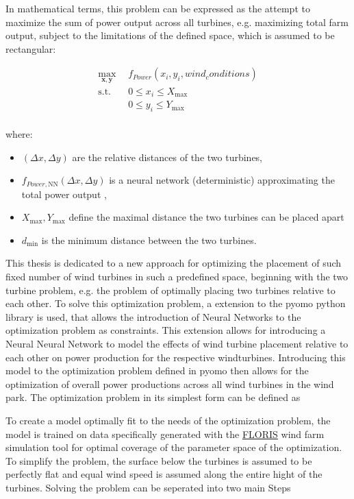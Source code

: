 In mathematical terms, this problem can be expressed as the attempt to maximize the sum of power output across all turbines, e.g. maximizing total farm output, subject to the limitations of the defined space, which is assumed to be rectangular: 

\begin{align}
	\max_{\mathbf{x}, \mathbf{y}} & f_{Power}(x_i, y_i, wind_conditions) \\
	\text{s.t.} \quad 
	&  0 \leq x_i \leq X_{\max} \\
	&  0 \leq y_i \leq Y_{\max} \\
\end{align}

where:
\begin{itemize}
	\item \( (\Delta x, \Delta y) \) are the relative distances of the two turbines,
	\item \( f_{Power, \text{NN}}(\Delta x, \Delta y)\) is a neural network (deterministic) approximating the total power output ,
	\item \(  X_{\max}, Y_{\max} \) define the maximal distance the two turbines can be placed apart
	\item \( d_{\min} \) is the minimum distance between the two turbines.
\end{itemize}


This thesis is dedicated to a new approach for optimizing the placement of such fixed number of wind turbines in such a predefined space, beginning with the two turbine problem, e.g. the problem of optimally placing two turbines relative to each other. To solve this optimization problem, a extension to the pyomo python library is used, that allows the introduction of Neural Networks to the optimization problem as constraints. \cite{ALCANTARA2023120895} This extension allows for introducing a Neural Neural Network to model the effects of wind turbine placement relative to each other on power production for the respective windturbines. Introducing this model to the optimization problem defined in pyomo then allows for the optimization of overall power productions across all wind turbines in the wind park. The optimization problem in its simplest form can be defined as


To create a model optimally fit to the needs of the optimization problem, the model is trained on data specifically generated with the \href{https://www.nrel.gov/wind/floris.html}{FLORIS} wind farm simulation tool  for optimal coverage of the parameter space of the optimization. To simplify the problem, the surface below the turbines is assumed to be perfectly flat and equal wind speed is assumed along the entire hight of the turbines. Solving the problem can be seperated into two main Steps 

